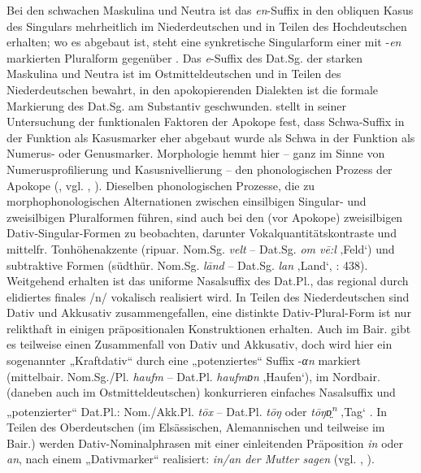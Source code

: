 Bei den schwachen Maskulina und Neutra ist das \textit{en}{}-Suffix in den obliquen Kasus des Singulars mehrheitlich im Niederdeutschen und in Teilen des Hochdeutschen erhalten; wo es abgebaut ist, steht eine synkretische Singularform einer mit -\textit{en} markierten Pluralform gegenüber \citep[440]{Schirmunski1962}. Das \textit{e}{}-Suffix des Dat.Sg. der starken Maskulina und Neutra ist im Ostmitteldeutschen und in Teilen des Niederdeutschen bewahrt, in den apokopierenden Dialekten ist die formale Markierung des Dat.Sg. am Substantiv geschwunden. \citet{Lindgren1953} stellt in seiner Untersuchung der funktionalen Faktoren der Apokope fest, dass Schwa-Suffix in der Funktion als Kasusmarker eher abgebaut wurde als Schwa in der Funktion als Numerus- oder Genusmarker. Morphologie hemmt hier -- ganz im Sinne von Numerusprofilierung und Kasusnivellierung -- den phonologischen Prozess der Apokope (\citealt[214]{Lindgren1953}, vgl. \citealt[51--52 und 134]{Birkenes2014}, \citealt[159--160]{Schirmunski1962}). Dieselben phonologischen Prozesse, die zu morphophonologischen Alternationen zwischen einsilbigen Singular- und zweisilbigen Pluralformen führen, sind auch bei den (vor Apokope) zweisilbigen Dativ-Singular-Formen zu beobachten, darunter Vokalquantitätskontraste und mittelfr. Tonhöhenakzente (ripuar. Nom.Sg. \textit{velt} -- Dat.Sg. \textit{om vē:l} ‚Feld‘) und subtraktive Formen (südthür. Nom.Sg. \textit{lānd} -- Dat.Sg. \textit{lan} ‚Land‘, \citealt{Schirmunski1962}: 438). Weitgehend erhalten ist das uniforme Nasalsuffix des Dat.Pl., das regional durch elidiertes finales /n/ vokalisch realisiert wird. In Teilen des Niederdeutschen sind Dativ und Akkusativ zusammengefallen, eine distinkte Dativ-Plural-Form ist nur relikthaft in einigen präpositionalen Konstruktionen erhalten. Auch im Bair. gibt es teilweise einen Zusammenfall von Dativ und Akkusativ, doch wird hier ein sogenannter „Kraftdativ“ durch eine „potenziertes“ Suffix -\textit{αn} markiert (mittelbair. Nom.Sg./Pl. \textit{haufm} -- Dat.Pl. \textit{haufmɒn} ‚Haufen‘), im Nordbair. (daneben auch im Ostmitteldeutschen) konkurrieren einfaches Nasalsuffix und „potenzierter“ Dat.Pl.: Nom./Akk.Pl. \textit{tōx} -- Dat.Pl. \textit{tōŋ} oder \textit{tōŋɒ̤\textsuperscript{n}} ‚Tag‘ \citep[441--442]{Schirmunski1962}. In Teilen des Oberdeutschen (im Elsässischen, Alemannischen und teilweise im Bair.) werden Dativ-Nominalphrasen mit einer einleitenden Präposition \textit{in} oder \textit{an}, nach \citet{Seiler2003} einem „Dativmarker“ realisiert: \textit{in/an der Mutter sagen} (vgl. \citealt[438--440]{Schirmunski1962}, \citealt[436]{Shrier1965}).


